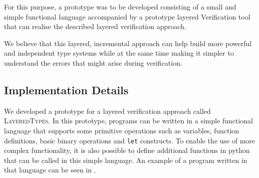 \documentclass{easychair}
\newcommand{\LayeredTypes}{\textsc{LayeredTypes}}
\begin{document}
For this purpose, a prototype was to be developed consisting of a small and simple functional language accompanied by a prototype layered Verification tool that can realise the described layered verification approach.

We believe that this layered, incremental approach can help build more powerful and independent type systems while at the same time making it simpler to understand the errors that might arise during verification.

\subsection{Implementation Details}

We developed a prototype for a layered verification approach called \LayeredTypes. In this prototype, programs can be written in a simple functional language that supports some primitive operations such as variables, function definitions, basic binary operations and \texttt{let} constructs. To enable the use of more complex functionality, it is also possible to define additional functions in python that can be called in this simple language. An example of a program written in that language can be seen in .
\end{document}
